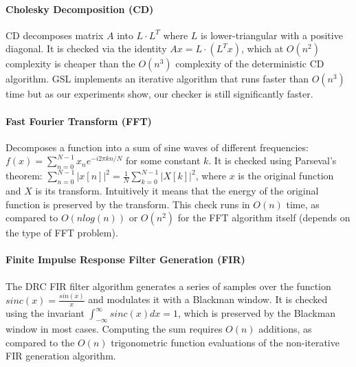 \documentclass[10pt, conference, compsocconf]{IEEEtran}
\begin{document}
\paragraph{Cholesky Decomposition (CD)}
CD decomposes matrix $A$ into $L \cdot L^T$ where $L$ is lower-triangular with a positive diagonal.
It is checked via the identity $Ax = L \cdot (L^T x)$, which at $O(n^2)$ complexity is cheaper than the $O(n^3)$ complexity of the deterministic CD algorithm.
GSL implements an iterative algorithm that runs faster than $O(n^3)$ time but as our experiments show, our checker is still significantly faster.

\paragraph{Fast Fourier Transform (FFT)}
Decomposes a function into a sum of sine waves of different frequencies: $f(x) = \sum_{n=0}^{N-1} x_n e^{-i2\pi k n / N}$ for some constant $k$.
It is checked using Parseval's theorem: $\sum_{n=0}^{N-1} \left| x[n] \right|^2 = \frac{1}{N} \sum_{k=0}^{N-1} \left| X[k] \right|^2$, where $x$ is the original function and $X$ is its transform.
Intuitively it means that the energy of the original function is preserved by the transform.
This check runs in $O(n)$ time, as compared to $O(n log(n))$ or $O(n^2)$ for the FFT algorithm itself (depends on the type of FFT problem).

\paragraph{Finite Impulse Response Filter Generation (FIR)}
The DRC FIR filter algorithm generates a series of samples over the function $sinc(x)=\frac{sin(x)}{x}$
and modulates it with a Blackman window.
It is checked using the invariant $\int_{-\infty}^{\infty} sinc(x)dx = 1$, which is preserved by the Blackman window in most cases.
Computing the sum requires $O(n)$ additions, as compared to the $O(n)$ trigonometric function evaluations of the non-iterative FIR generation algorithm.
\end{document}
